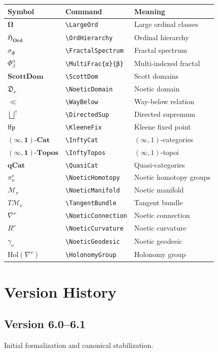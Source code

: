 \documentclass[11pt,twoside,openright]{book}
\theoremstyle{definition}
\theoremstyle{plain}
\theoremstyle{remark}
\newcommand{\Ord}{\mathbf{Ord}}              %
\newcommand{\LargeOrd}{\boldsymbol{\Omega}}          %
\newcommand{\OrdHierarchy}{\mathfrak{H}_{\Ord}}      %
\newcommand{\FractalSpectrum}{\sigma_\Phi}           %
\newcommand{\MultiFrac}[2]{\Phi^{#1}_{#2}}           %
\newcommand{\ScottDom}{\mathbf{ScottDom}}            %
\newcommand{\NoeticDomain}{\mathfrak{D}_\nu}         %
\newcommand{\WayBelow}{\ll}                          %
\newcommand{\DirectedSup}{\bigsqcup^{\uparrow}}      %
\newcommand{\KleeneFix}{\mathsf{lfp}}                %
\newcommand{\InftyCat}{\mathbf{(\infty,1)\text{-}Cat}}  %
\newcommand{\InftyTopos}{\mathbf{(\infty,1)\text{-}Topos}} %
\newcommand{\QuasiCat}{\mathbf{qCat}}                %
\newcommand{\NoeticHomotopy}{\pi^{\nu}_n}            %
\newcommand{\NoeticManifold}{\mathcal{M}_\nu}        %
\newcommand{\TangentBundle}{T\mathcal{M}_\nu}        %
\newcommand{\NoeticConnection}{\nabla^\nu}           %
\newcommand{\NoeticCurvature}{R^\nu}                 %
\newcommand{\NoeticGeodesic}{\gamma_\nu}             %
\newcommand{\HolonomyGroup}{\mathrm{Hol}(\nabla^\nu)} %
\begin{document}
\begin{center}
\begin{longtable}{lll}
\toprule
\textbf{Symbol} & \textbf{Command} & \textbf{Meaning} \\
\midrule
\endhead
$\LargeOrd$ & \verb|\LargeOrd| & Large ordinal classes \\
$\OrdHierarchy$ & \verb|\OrdHierarchy| & Ordinal hierarchy \\
$\FractalSpectrum$ & \verb|\FractalSpectrum| & Fractal spectrum \\
$\MultiFrac{\alpha}{\beta}$ & \verb|\MultiFrac{α}{β}| & Multi-indexed fractal \\
$\ScottDom$ & \verb|\ScottDom| & Scott domains \\
$\NoeticDomain$ & \verb|\NoeticDomain| & Noetic domain \\
$\WayBelow$ & \verb|\WayBelow| & Way-below relation \\
$\DirectedSup$ & \verb|\DirectedSup| & Directed supremum \\
$\KleeneFix$ & \verb|\KleeneFix| & Kleene fixed point \\
$\InftyCat$ & \verb|\InftyCat| & $(\infty,1)$-categories \\
$\InftyTopos$ & \verb|\InftyTopos| & $(\infty,1)$-topoi \\
$\QuasiCat$ & \verb|\QuasiCat| & Quasi-categories \\
$\NoeticHomotopy$ & \verb|\NoeticHomotopy| & Noetic homotopy groups \\
$\NoeticManifold$ & \verb|\NoeticManifold| & Noetic manifold \\
$\TangentBundle$ & \verb|\TangentBundle| & Tangent bundle \\
$\NoeticConnection$ & \verb|\NoeticConnection| & Noetic connection \\
$\NoeticCurvature$ & \verb|\NoeticCurvature| & Noetic curvature \\
$\NoeticGeodesic$ & \verb|\NoeticGeodesic| & Noetic geodesic \\
$\HolonomyGroup$ & \verb|\HolonomyGroup| & Holonomy group \\
\bottomrule
\end{longtable}
\end{center}

\chapter{Version History}
\label{ch:version-history}

\section{Version 6.0--6.1}
Initial formalization and canonical stabilization.
\end{document}
